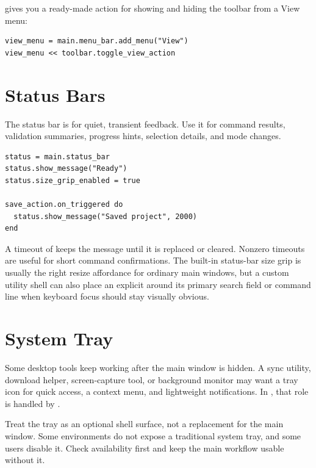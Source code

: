  gives you a ready-made action for showing and hiding the toolbar from a View menu:

\begin{lstlisting}[style=crystal]
view_menu = main.menu_bar.add_menu("View")
view_menu << toolbar.toggle_view_action
\end{lstlisting}

\section{Status Bars}

The status bar is for quiet, transient feedback. Use it for command results, validation summaries, progress hints, selection details, and mode changes.

\begin{lstlisting}[style=crystal]
status = main.status_bar
status.show_message("Ready")
status.size_grip_enabled = true

save_action.on_triggered do
  status.show_message("Saved project", 2000)
end
\end{lstlisting}

A timeout of  keeps the message until it is replaced or cleared. Nonzero timeouts are useful for short command confirmations. The built-in status-bar size grip is usually the right resize affordance for ordinary main windows, but a custom utility shell can also place an explicit  around its primary search field or command line when keyboard focus should stay visually obvious.

\section{System Tray}

Some desktop tools keep working after the main window is hidden. A sync utility, download helper, screen-capture tool, or background monitor may want a tray icon for quick access, a context menu, and lightweight notifications. In , that role is handled by .

Treat the tray as an optional shell surface, not a replacement for the main window. Some environments do not expose a traditional system tray, and some users disable it. Check availability first and keep the main workflow usable without it.

